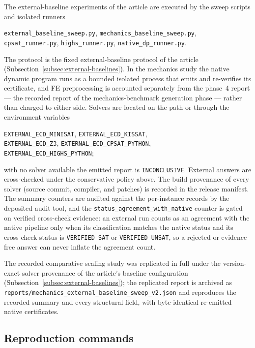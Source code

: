 The external-baseline experiments of the article are executed by the sweep
scripts and isolated runners
\begin{center}
\footnotesize
\texttt{external\_baseline\_sweep.py}, \texttt{mechanics\_baseline\_sweep.py},\\
\texttt{cpsat\_runner.py}, \texttt{highs\_runner.py},
\texttt{native\_dp\_runner.py}.
\end{center}
\noindent The protocol is the fixed external-baseline protocol of the article
(Subsection~\ref{subsec:external-baselines}). In the mechanics study
the native dynamic program runs as a bounded isolated process that emits and
re-verifies its certificate, and FE preprocessing is accounted separately
from the phase~4 report --- the recorded report of the mechanics-benchmark
generation phase --- rather than charged to either side. Solvers are located on the path or through the
environment variables
\begin{center}
\footnotesize
\texttt{EXTERNAL\_ECD\_MINISAT}, \texttt{EXTERNAL\_ECD\_KISSAT},\\
\texttt{EXTERNAL\_ECD\_Z3}, \texttt{EXTERNAL\_ECD\_CPSAT\_PYTHON},\\
\texttt{EXTERNAL\_ECD\_HIGHS\_PYTHON};
\end{center}
with no solver available the emitted report is \texttt{INCONCLUSIVE}. External
answers are cross-checked under the conservative policy above. The build
provenance of every solver (source commit, compiler, and patches) is recorded
in the release manifest. The summary counters are audited against the
per-instance records by the deposited audit tool, and the
\texttt{status\_agreement\_with\_native} counter is gated on verified
cross-check evidence: an external run counts as an agreement with the native
pipeline only when its classification matches the native status and its
cross-check status is \texttt{VERIFIED-SAT} or \texttt{VERIFIED-UNSAT}, so a
rejected or evidence-free answer can never inflate the agreement count.

The recorded comparative scaling study was replicated in full under the
version-exact solver provenance of the article's baseline configuration
(Subsection~\ref{subsec:external-baselines}); the replicated report is
archived as
\texttt{reports/mechanics\_external\_baseline\_sweep\_v2.json} and reproduces
the recorded summary and every structural field, with byte-identical
re-emitted native certificates.

\subsection{Reproduction commands}

